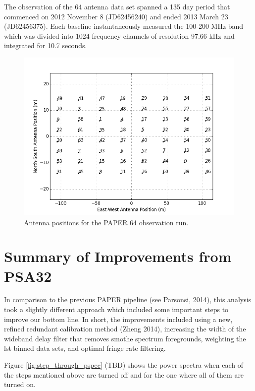 \documentclass[twocolumn,numberedappendix]{emulateapj}
\begin{document}
The observation of the 64 antenna data set spanned a 135 day period that
commenced on 2012 November 8 (JD62456240) and ended  2013 March 23 (JD62456375). 
Each baseline instantaneously measured the 100-200 MHz band which was divided
into 1024 frequency channels of resolution 97.66 kHz and integrated for 10.7
seconds.  

\begin{figure}\centering
\includegraphics[width=1.85\columnwidth]{plots/antenna_positions.png}
\caption{Antenna positions for the PAPER 64 observation run.}
\label{fig:antenna_positions}
\end{figure}

\section{Summary of Improvements from PSA32}
In comparison to the previous PAPER pipeline (see Parsonsi, 2014), this analysis
took a slightly different approach which included some important steps to
improve our bottom line. In short, the improvements included using a new, 
refined redundant calibration method (Zheng 2014), increasing the width of the
wideband delay filter that removes smothe spectrum foregrounds, weighting the
lst binned data sets, and optimal fringe rate filtering. 

Figure \ref{fig:step_through_pspec} (TBD) shows the power spectra when each of the
steps mentioned above are turned off and for the one where all of them are
turned on.


\end{document}
